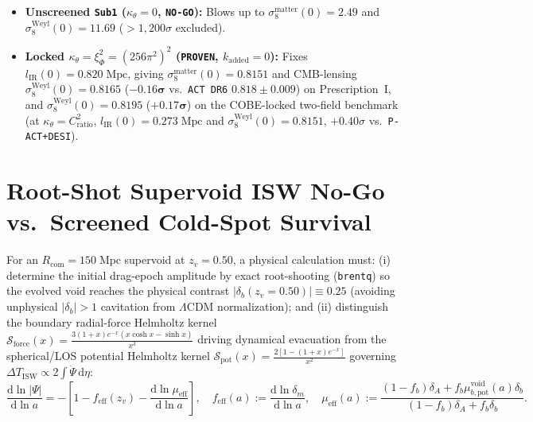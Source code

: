 \documentclass[11pt,a4paper]{article}
\begin{document}
\begin{itemize}
  \item \textbf{Unscreened {\upshape\texttt{Sub1}} ($\kappa_\theta = 0$, {\upshape\texttt{NO-GO}}):} Blows up to $\sigma_8^{\mathrm{matter}}(0) = \mathbf{2.49}$ and $\sigma_8^{\mathrm{Weyl}}(0) = \mathbf{11.69}$ ($>1{,}200\sigma$ excluded).
  \item \textbf{Locked $\kappa_\theta = \xi_\Phi^2 = (256\pi^2)^2$ ({\upshape\texttt{PROVEN}}, $k_{\mathrm{added}} = 0$):} Fixes $l_{\mathrm{IR}}(0) = \mathbf{0.820\;\mathrm{Mpc}}$, giving $\sigma_8^{\mathrm{matter}}(0) = \mathbf{0.8151}$ and CMB-lensing $\sigma_8^{\mathrm{Weyl}}(0) = \mathbf{0.8165}$ ($\mathbf{-0.16\sigma}$ vs.\ {\upshape\texttt{ACT DR6}} $0.818 \pm 0.009$) on Prescription~I, and $\sigma_8^{\mathrm{Weyl}}(0) = \mathbf{0.8195}$ ($\mathbf{+0.17\sigma}$) on the COBE-locked two-field benchmark (at $\kappa_\theta = C_{\mathrm{ratio}}^2$, $l_{\mathrm{IR}}(0) = 0.273\;\mathrm{Mpc}$ and $\sigma_8^{\mathrm{Weyl}}(0) = \mathbf{0.8151}$, $+0.40\sigma$ vs.\ {\upshape\texttt{P-ACT+DESI}}).
\end{itemize}

\section{Root-Shot Supervoid ISW No-Go vs.\ Screened Cold-Spot Survival}
\label{sec:isw-supervoid}

For an $R_{\mathrm{com}} = 150\;\mathrm{Mpc}$ supervoid at $z_v = 0.50$, a physical calculation must: (i) determine the initial drag-epoch amplitude by exact root-shooting (\texttt{brentq}) so the evolved void reaches the physical contrast $|\delta_b(z_v = 0.50)| \equiv 0.25$ (avoiding unphysical $|\delta_b| > 1$ cavitation from $\Lambda$CDM normalization); and (ii) distinguish the boundary radial-force Helmholtz kernel $\mathcal{S}_{\mathrm{force}}(x) = \frac{3(1+x)e^{-x}(x\cosh x - \sinh x)}{x^3}$ driving dynamical evacuation from the spherical/LOS potential Helmholtz kernel $\mathcal{S}_{\mathrm{pot}}(x) = \frac{2[1 - (1+x)e^{-x}]}{x^2}$ governing $\Delta T_{\mathrm{ISW}} \propto 2\int\dot{\Psi}\,\mathrm{d}\eta$:
\begin{equation}
  \frac{\mathrm{d}\ln|\Psi|}{\mathrm{d}\ln a} = -\left[1 - f_{\mathrm{eff}}(z_v) - \frac{\mathrm{d}\ln\mu_{\mathrm{eff}}}{\mathrm{d}\ln a}\right], \quad f_{\mathrm{eff}}(a) := \frac{\mathrm{d}\ln\delta_m}{\mathrm{d}\ln a}, \quad \mu_{\mathrm{eff}}(a) := \frac{(1 - f_b)\delta_A + f_b\mu_{b,\mathrm{pot}}^{\mathrm{void}}(a)\delta_b}{(1 - f_b)\delta_A + f_b\delta_b}.
  \label{eq:isw-exact}
\end{equation}
\end{document}
